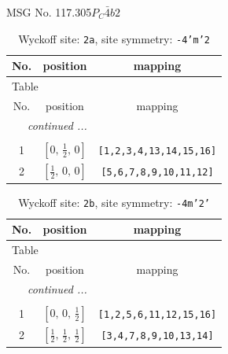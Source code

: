 \documentclass[fleqn,8pt]{jsarticle}
\begin{document}
\setcounter{MaxMatrixCols}{32}

\renewcommand{\tablename}{Table~}
\renewcommand{\figurename}{Figure~}
\begin{center}
\LARGE
MSG No. 117.305\quad$P_{C}\bar{4}b2$
\end{center}
\renewcommand{\arraystretch}{1.2}
\begin{longtable}{ccc}
\caption{Wyckoff site: {\tt 2a}, site symmetry: {\tt -4'm'2}}
 \\
 \hline \hline
No. & position & mapping \\ \hline \endfirsthead

\multicolumn{2}{l}{\tablename\ \thetable{}} \\
 \hline \hline
No. & position & mapping \\ \hline \endhead

 \hline \hline
\multicolumn{2}{r}{\footnotesize\it continued ...} \\ \endfoot

 \hline \hline
\multicolumn{2}{r}{} \\ \endlastfoot

1 & $\left[ 0,\, \frac{1}{2},\, 0 \right]$ & {\tt [1,2,3,4,13,14,15,16]} \\ \hline
2 & $\left[ \frac{1}{2},\, 0,\, 0 \right]$ & {\tt [5,6,7,8,9,10,11,12]} \\
\end{longtable}
\renewcommand{\arraystretch}{1.2}
\begin{longtable}{ccc}
\caption{Wyckoff site: {\tt 2b}, site symmetry: {\tt -4m'2'}}
 \\
 \hline \hline
No. & position & mapping \\ \hline \endfirsthead

\multicolumn{2}{l}{\tablename\ \thetable{}} \\
 \hline \hline
No. & position & mapping \\ \hline \endhead

 \hline \hline
\multicolumn{2}{r}{\footnotesize\it continued ...} \\ \endfoot

 \hline \hline
\multicolumn{2}{r}{} \\ \endlastfoot

1 & $\left[ 0,\, 0,\, \frac{1}{2} \right]$ & {\tt [1,2,5,6,11,12,15,16]} \\ \hline
2 & $\left[ \frac{1}{2},\, \frac{1}{2},\, \frac{1}{2} \right]$ & {\tt [3,4,7,8,9,10,13,14]} \\
\end{longtable}
\end{document}
